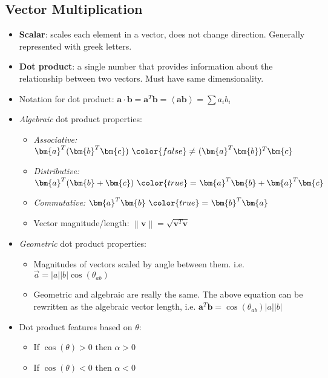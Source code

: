 \documentclass[12pt,a4paper]{article}
\begin{document}
\subsection{Vector Multiplication}
\begin{itemize}
    \item \textbf{Scalar}: scales each element in a vector, does not change direction. Generally represented with greek letters.
    \item \textbf{Dot product}: a single number that provides information about the relationship between two vectors. Must have {\color{o-Sun}same dimensionality}.
    \item Notation for dot product: \(\bm{a}\cdot \bm{b} = \bm{a}^T\bm{b} = \left\langle \bm{ab} \right\rangle = \sum a_i b_i\)
    \item \textit{Algebraic} dot product properties:
        \begin{itemize}
            \item {\color{false}\textit{Associative:}} \(\bm{a}^T(\bm{b}^T\bm{c})~{\color{false}\neq}~(\bm{a}^T\bm{b})^T\bm{c}\)
            \item {\color{true}\textit{Distributive: }} \(\bm{a}^T(\bm{b}+\bm{c})~{\color{true}=}~\bm{a}^T\bm{b} + \bm{a}^T\bm{c}\)
            \item  {\color{true}\textit{Commutative:}} \(\bm{a}^T\bm{b} ~{\color{true}=}~\bm{b}^T\bm{a}\)
            \item Vector magnitude/length: {\color{o-Sun}\(\left\lVert \bm{v}\right\rVert = \sqrt{\bm{v}^T\bm{v}}\)}
        \end{itemize}
    \item \textit{Geometric} dot product properties:
        \begin{itemize}
            \item Magnitudes of vectors scaled by angle between them. i.e. {\color{o-Sun}\(\vec{a} = |a||b|\cos(\theta_{ab})\)}
            \item Geometric and algebraic are really the same. The above equation can be rewritten as the algebraic vector length, i.e.  {\color{o-Sun}\(\bm{a}^T\bm{b} = \cos(\theta_{ab})|a||b|\)}
        \end{itemize}
    \item Dot product features based on \(\theta\):
        \begin{itemize}
            \item If {\color{pos}\(\cos(\theta) > 0\)} then {\color{pos}\(\alpha > 0\)}
            \item If {\color{neg}\(\cos(\theta) < 0\)} then {\color{neg}\(\alpha < 0\)}

\end{itemize}
\end{itemize}
\end{document}
